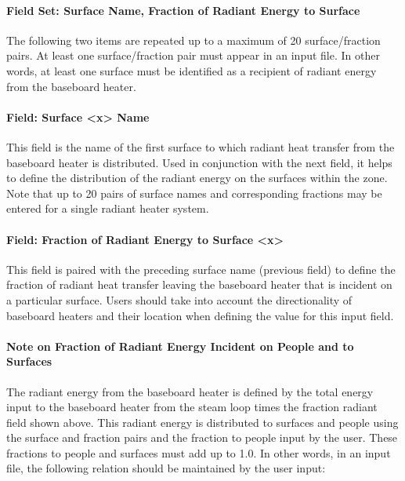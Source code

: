 \paragraph{Field Set: Surface Name, Fraction of Radiant Energy to Surface}\label{field-set-surface-name-fraction-of-radiant-energy-to-surface-1}

The following two items are repeated up to a maximum of 20 surface/fraction pairs. At least one surface/fraction pair must appear in an input file. In other words, at least one surface must be identified as a recipient of radiant energy from the baseboard heater.

\paragraph{Field: Surface \textless{}x\textgreater{} Name}\label{field-surface-x-name-1}

This field is the name of the first surface to which radiant heat transfer from the baseboard heater is distributed. Used in conjunction with the next field, it helps to define the distribution of the radiant energy on the surfaces within the zone. Note that up to 20 pairs of surface names and corresponding fractions may be entered for a single radiant heater system.

\paragraph{Field: Fraction of Radiant Energy to Surface \textless{}x\textgreater{}}\label{field-fraction-of-radiant-energy-to-surface-x-1}

This field is paired with the preceding surface name (previous field) to define the fraction of radiant heat transfer leaving the baseboard heater that is incident on a particular surface. Users should take into account the directionality of baseboard heaters and their location when defining the value for this input field.

\paragraph{Note on Fraction of Radiant Energy Incident on People and to Surfaces}\label{note-on-fraction-of-radiant-energy-incident-on-people-and-to-surfaces}

The radiant energy from the baseboard heater is defined by the total energy input to the baseboard heater from the steam loop times the fraction radiant field shown above. This radiant energy is distributed to surfaces and people using the surface and fraction pairs and the fraction to people input by the user. These fractions to people and surfaces must add up to 1.0. In other words, in an input file, the following relation should be maintained by the user input:

